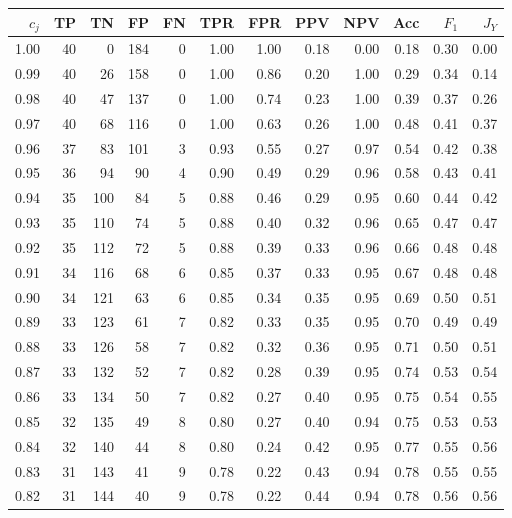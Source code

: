 \clearpage
\begin{table}[ht]
\centering
{}
\captionsetup{font=scriptsize}
\begingroup\tiny
\begin{tabular}{r|rrrrrrrrrrr}
  $c_j$ & TP & TN & FP & FN & TPR & FPR & PPV & NPV & Acc & $F_1$ & $J_Y$ \\ 
  \hline
  1.00 & 40 & 0 & 184 & 0 & 1.00 & 1.00 & 0.18 & 0.00 & 0.18 & 0.30 & 0.00 \\ 
  0.99 & 40 & 26 & 158 & 0 & 1.00 & 0.86 & 0.20 & 1.00 & 0.29 & 0.34 & 0.14 \\ 
  0.98 & 40 & 47 & 137 & 0 & 1.00 & 0.74 & 0.23 & 1.00 & 0.39 & 0.37 & 0.26 \\ 
  0.97 & 40 & 68 & 116 & 0 & 1.00 & 0.63 & 0.26 & 1.00 & 0.48 & 0.41 & 0.37 \\ 
  0.96 & 37 & 83 & 101 & 3 & 0.93 & 0.55 & 0.27 & 0.97 & 0.54 & 0.42 & 0.38 \\ 
  0.95 & 36 & 94 & 90 & 4 & 0.90 & 0.49 & 0.29 & 0.96 & 0.58 & 0.43 & 0.41 \\ 
  0.94 & 35 & 100 & 84 & 5 & 0.88 & 0.46 & 0.29 & 0.95 & 0.60 & 0.44 & 0.42 \\ 
  0.93 & 35 & 110 & 74 & 5 & 0.88 & 0.40 & 0.32 & 0.96 & 0.65 & 0.47 & 0.47 \\ 
  0.92 & 35 & 112 & 72 & 5 & 0.88 & 0.39 & 0.33 & 0.96 & 0.66 & 0.48 & 0.48 \\ 
  0.91 & 34 & 116 & 68 & 6 & 0.85 & 0.37 & 0.33 & 0.95 & 0.67 & 0.48 & 0.48 \\ 
  0.90 & 34 & 121 & 63 & 6 & 0.85 & 0.34 & 0.35 & 0.95 & 0.69 & 0.50 & 0.51 \\ 
  0.89 & 33 & 123 & 61 & 7 & 0.82 & 0.33 & 0.35 & 0.95 & 0.70 & 0.49 & 0.49 \\ 
  0.88 & 33 & 126 & 58 & 7 & 0.82 & 0.32 & 0.36 & 0.95 & 0.71 & 0.50 & 0.51 \\ 
  0.87 & 33 & 132 & 52 & 7 & 0.82 & 0.28 & 0.39 & 0.95 & 0.74 & 0.53 & 0.54 \\ 
  0.86 & 33 & 134 & 50 & 7 & 0.82 & 0.27 & 0.40 & 0.95 & 0.75 & 0.54 & 0.55 \\ 
  0.85 & 32 & 135 & 49 & 8 & 0.80 & 0.27 & 0.40 & 0.94 & 0.75 & 0.53 & 0.53 \\ 
  0.84 & 32 & 140 & 44 & 8 & 0.80 & 0.24 & 0.42 & 0.95 & 0.77 & 0.55 & 0.56 \\ 
  0.83 & 31 & 143 & 41 & 9 & 0.78 & 0.22 & 0.43 & 0.94 & 0.78 & 0.55 & 0.55 \\ 
  0.82 & 31 & 144 & 40 & 9 & 0.78 & 0.22 & 0.44 & 0.94 & 0.78 & 0.56 & 0.56 \\ 

\end{tabular}
\end{table}
